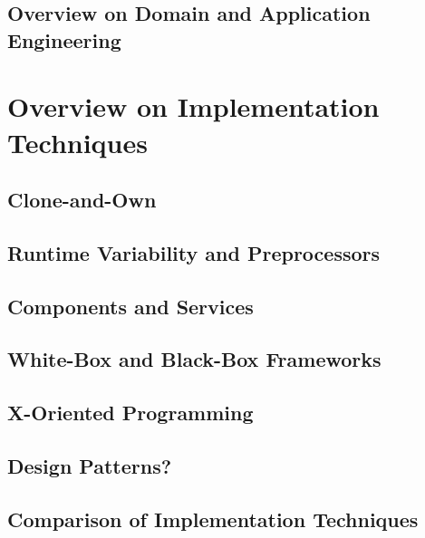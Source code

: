 \documentclass[
	aspectratio=169, %
	8pt, %
	handout, %
]{beamer}
\begin{document}
\subsection{Overview on Domain and Application Engineering}

%

\lessonslearned{
	\item \ldots
}{
	\item \ldots
}{
	\ldots
}

\sectionend

\section{Overview on Implementation Techniques}

\subsection{Clone-and-Own}
\subsection{Runtime Variability and Preprocessors}
\subsection{Components and Services}
\subsection{White-Box and Black-Box Frameworks}
\subsection{X-Oriented Programming}
\subsection{Design Patterns?}
\subsection{Comparison of Implementation Techniques}
\end{document}
